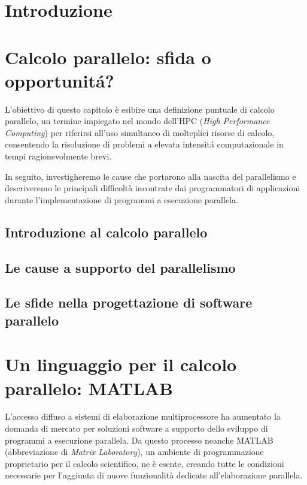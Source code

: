\documentclass[
	a4paper,
	twoside,
	12pt
]{book}
\theoremstyle{StileEsempio}
\begin{document}
\frontmatter

\tableofcontents
\mainmatter
\chapter*{Introduzione}

\chapter{Calcolo parallelo: sfida o opportunit\'a?}
\label{cap1}
L'obiettivo di questo capitolo \`e esibire una definizione puntuale di calcolo parallelo, un termine impiegato nel mondo
dell'HPC (\textit{High Performance Computing}) per riferirsi all’uso simultaneo di molteplici risorse di calcolo, consentendo la risoluzione di problemi a 
elevata intensit\'a computazionale in tempi ragionevolmente brevi.

In seguito, investigheremo le cause che portarono alla nascita del parallelismo e descriveremo le principali difficolt\`a incontrate dai programmatori di 
applicazioni durante l'implementazione di programmi a esecuzione parallela.
\section{Introduzione al calcolo parallelo}
\label{par1.1}

\section{Le cause a supporto del parallelismo}
\label{par1.2}

\section{Le sfide nella progettazione di software parallelo}
\label{par1.3}

\chapter{Un linguaggio per il calcolo parallelo: MATLAB}
\label{cap2}
L'accesso diffuso a sistemi di elaborazione multiprocessore ha aumentato 
la domanda di mercato per soluzioni software a supporto dello sviluppo di programmi a esecuzione parallela. \newline 
Da questo processo neanche MATLAB (abbreviazione di \textit{Matrix Laboratory}), un ambiente di programmazione proprietario per il calcolo scientifico, ne \`e esente, 
creando tutte le condizioni necessarie per l'aggiunta di nuove funzionalit\`a dedicate all'elaborazione parallela.
\end{document}
